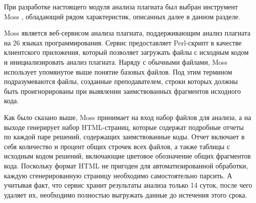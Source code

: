 \documentclass{article}
\begin{document}
При разработке настоящего модуля анализа плагиата был выбран инструмент Moss \citep{mossOriginalPaper}, обладающий рядом характеристик, описанных далее в данном разделе.

Moss является веб-сервисом анализа плагиата, поддерживающим анализ плагиата на 26 языках программирования. Сервис предоставляет Perl-скрипт в качестве клиентского приложения, который позволяет загружать файлы с исходным кодом и инициализировать анализ плагиата. Наряду с обычными файлами, Moss использует упомянутое выше понятие базовых файлов. Под этим термином подразумеваются файлы, созданные преподавателем, строки которых должны быть проигнорированы при выявлении заимствованных фрагментов исходного кода.

Как было сказано выше, Moss принимает на вход набор файлов для анализа, а на выходе генерирует набор HTML-страниц, которые содержат подробные отчеты по каждой паре решений, содержащих заимствованные коды. Отчет включает в себя количество и процент общих строчек всех файлов, а также таблицы с исходным кодом решений, включающие цветовое обозначение общих фрагментов кода. Поскольку формат HTML не пригоден для автоматизированной обработки, каждую сгенерированную страницу необходимо самостоятельно парсить. А учитывая факт, что сервис хранит результаты анализа только 14 суток, после чего удаляет их, необходимо полностью выгружать данные до истечения этого срока.



\end{document}
